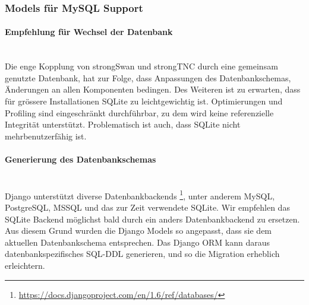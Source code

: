 %
%

\subsubsection{Models für MySQL Support}
\paragraph{Empfehlung für Wechsel der Datenbank} \hspace{0pt} \\
Die enge Kopplung von strongSwan und strongTNC durch eine gemeinsam genutzte
Datenbank, hat zur Folge, dass Anpassungen des Datenbankschemas, Änderungen an
allen Komponenten bedingen. Des Weiteren ist zu erwarten, dass für grössere
Installationen SQLite zu leichtgewichtig ist. Optimierungen und Profiling sind
eingeschränkt durchführbar, zu dem wird keine referenzielle Integrität
unterstützt. Problematisch ist auch, dass SQLite nicht mehrbenutzerfähig ist.

\paragraph{Generierung des Datenbankschemas} \hspace{0pt} \\
Django unterstützt diverse Datenbankbackends
\footnote{\url{https://docs.djangoproject.com/en/1.6/ref/databases/}}, unter
anderem MySQL, PostgreSQL, MSSQL und das zur Zeit verwendete SQLite. Wir
empfehlen das SQLite Backend möglichst bald durch ein anders Datenbankbackend zu
ersetzen. Aus diesem Grund wurden die Django Models so angepasst, dass sie dem
aktuellen Datenbankschema entsprechen. Das Django ORM kann daraus
datenbankspezifisches SQL-DDL generieren, und so die Migration erheblich
erleichtern.

